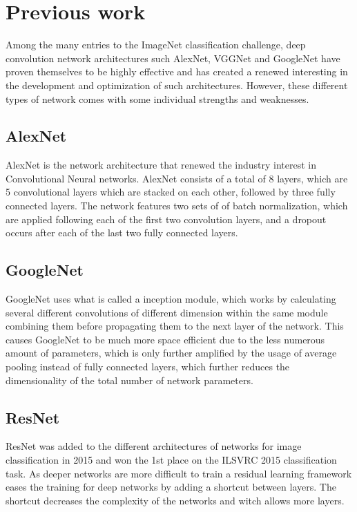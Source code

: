 \documentclass{kthreport}
\begin{document}
\section{Previous work}
Among the many entries to the ImageNet classification challenge, deep convolution network architectures such AlexNet, VGGNet and GoogleNet have proven themselves to be highly effective and has created a renewed interesting in the development and optimization of such architectures. However, these different types of network comes with some individual strengths and weaknesses.



\subsection{AlexNet}
AlexNet is the network architecture that renewed the industry interest in Convolutional Neural networks. AlexNet consists of a total of 8 layers, which are 5 convolutional layers which are stacked on each other, followed by three fully connected layers. The network features two sets of of batch normalization, which are applied following each of the first two convolution layers, and a dropout occurs after each of the last two fully connected layers.
\subsection{GoogleNet}
GoogleNet uses what is called a inception module, which works by calculating several different convolutions of different dimension within the same module combining them before propagating them to the next layer of the network\cite{szegedy2016rethinking}. This causes GoogleNet to be much more space efficient due to the less numerous amount of parameters, which is only further amplified by the usage of average pooling instead of fully connected layers, which further reduces the dimensionality of the total number of network parameters.
\subsection{ResNet}
ResNet was added to the different architectures of networks for image classification in 2015 and won the 1st place on the ILSVRC 2015 classification task. As deeper networks are more difficult to train a residual learning framework eases the training for deep networks by adding a shortcut between layers. The shortcut decreases the complexity of the networks and witch allows more layers.
\end{document}
